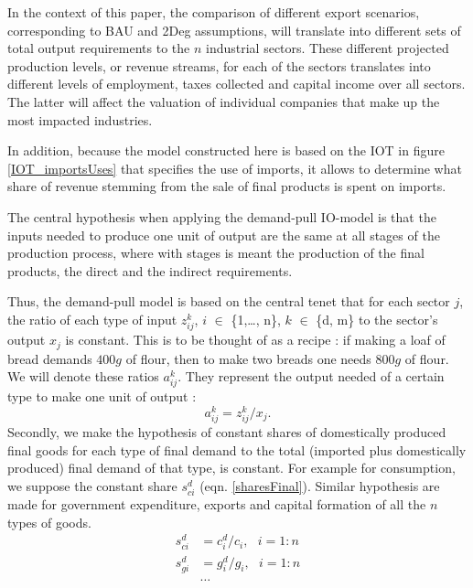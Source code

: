 \documentclass[12pt,english]{article}
\begin{document}
In the context of this paper, the comparison of different export scenarios, corresponding to BAU and 2Deg assumptions, will translate into different sets of total output requirements to the $n$ industrial sectors. These different projected production levels, or revenue streams, for each of the sectors translates into different levels of employment, taxes collected and capital income over all sectors. The latter will affect the valuation of individual companies that make up the most impacted industries. 

In addition, because the model constructed here is based on the IOT in figure \ref{IOT_importsUses} that specifies the use of imports, it allows to determine what share of revenue stemming from the sale of final products is spent on imports.

The central hypothesis when applying the demand-pull IO-model is that the inputs needed to produce one unit of output are the same at all stages of the production process, where with stages is meant the production of the final products, the direct and the indirect requirements.



Thus, the demand-pull model is based on the central tenet that for each sector $j$, the ratio of each type of input $z_{ij}^k$, $i$ $\in$ \{1,\ldots, n\}, $k$ $\in$ \{d, m\} to the sector's output $x_j$ is constant. This is to be thought of as a recipe : if making a loaf of bread demands $400g$ of flour, then to make two breads one needs $800g$ of flour. We will denote these ratios $a_{ij}^k$. They represent the output needed of a certain type to make one unit of output : 
\begin{equation}
a_{ij}^k = z_{ij}^k/x_j. \label{sharesIntermediate}
\end{equation}
Secondly, we make the hypothesis of constant shares of domestically produced final goods for each type of final demand to the %
total (imported plus domestically produced) final demand of that type, is constant. For example for consumption, we suppose the constant share $s^d_{ci}$ (eqn. \ref{sharesFinal}). Similar hypothesis are made for government expenditure, exports and capital formation of all the $n$ types of goods.
\begin{align}
s^d_{ci}&=c_i^d/c_i, \ \ \  i=1:n \label{sharesFinal}\\
s^d_{gi}&=g_i^d/g_i, \ \ \  i=1:n \nonumber\\
&\ldots \nonumber
\end{align} 
\end{document}
